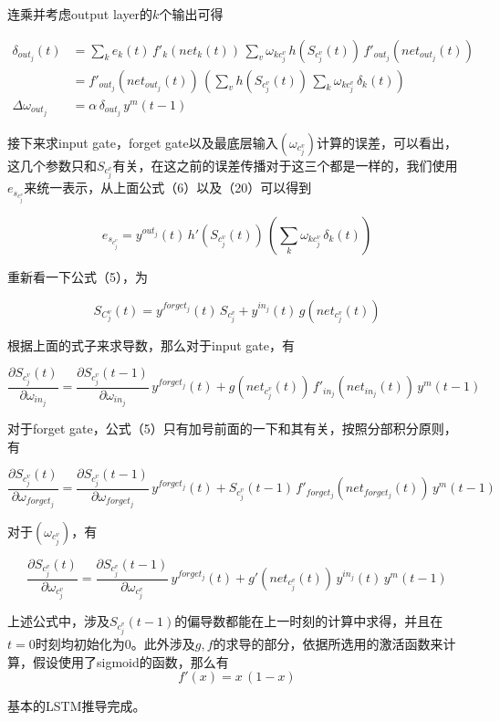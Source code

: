 \documentclass[UTF8]{ctexart}
\begin{document}
连乘并考虑output layer的$k$个输出可得

\begin{align}
\delta_{out_j}(t) &= \sum_k e_k(t) \, {f'}_k(net_k(t)) \, \sum_v\omega_{kc^v_j} \, h(S_{c^v_j}(t)) \, {f'}_{out_j}(net_{out_j}(t)) \\
&= {f'}_{out_j}(net_{out_j}(t)) \, (\sum_v h(S_{c^v_j}(t)) \, \sum_k\omega_{kc^v_j} \, \delta_k(t)) \\
\Delta \omega_{out_j} &= \alpha \, \delta_{out_j} \, y^m(t-1)
\end{align}

接下来求input gate，forget gate以及最底层输入$(\omega_{c^v_j})$计算的误差，可以看出，这几个参数只和$S_{c^v_j}$有关，在这之前的误差传播对于这三个都是一样的，我们使用$e_{s_{c^v_j}}$来统一表示，从上面公式（6）以及（20）可以得到

\begin{equation}
e_{s_{c^v_j}} = y^{out_j}(t) \, {h'}(S_{c^v_j}(t)) \, (\sum_k\omega_{kc^v_j} \, \delta_k(t))
\end{equation}

重新看一下公式（5），为

\begin{equation*}
S_{C^v_j}(t) = y^{forget_j}(t) \, S_{c^v_j} + y^{in_j}(t) \, g(net_{c^v_j}(t))
\end{equation*}

根据上面的式子来求导数，那么对于input gate，有

\begin{equation}
\frac{\partial S_{c^v_j}(t)} {\partial \omega_{in_j}} = \frac{\partial S_{c^v_j}(t-1)} {\partial \omega_{in_j}} \, y^{forget_j}(t) + g(net_{c^v_j}(t)) \, {f'}_{in_j}(net_{in_j}(t)) \, y^m(t-1)
\end{equation}

对于forget gate，公式（5）只有加号前面的一下和其有关，按照分部积分原则，有

\begin{equation}
\frac{\partial S_{c^v_j}(t)} {\partial \omega_{forget_j}} =  \frac{\partial S_{c^v_j}(t-1)} {\partial \omega_{forget_j}} \, y^{forget_j}(t) + S_{c^v_j}(t-1) \, {f'}_{forget_j}(net_{forget_j}(t)) \, y^m(t-1)
\end{equation}

对于$(\omega_{c^v_j})$，有

\begin{equation}
\frac{\partial S_{c^v_j}(t)} {\partial \omega_{c^v_j}} =  \frac{\partial S_{c^v_j}(t-1)} {\partial \omega_{c^v_j}} \, y^{forget_j}(t) + g'(net_{c^v_j}(t)) \, y^{in_j}(t) \, y^m(t-1)
\end{equation}

上述公式中，涉及$S_{c^v_j}(t-1)$的偏导数都能在上一时刻的计算中求得，并且在$t = 0$时刻均初始化为0。此外涉及$g, f$的求导的部分，依据所选用的激活函数来计算，假设使用了sigmoid的函数，那么有
\begin{equation}
f'(x) = x \, (1-x)
\end{equation}

基本的LSTM推导完成。
\end{document}
